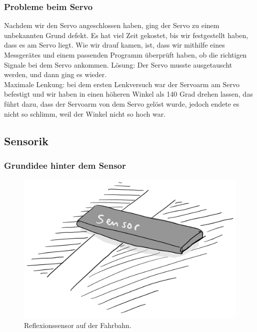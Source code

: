     \subsubsection{Probleme beim Servo}
        
            Nachdem wir den Servo angeschlossen haben, ging der Servo zu einem unbekannten Grund defekt. Es hat viel Zeit gekostet, bis wir festgestellt haben, dass es am Servo liegt.
            Wie wir drauf kamen, ist, dass wir mithilfe eines Messgerätes und einem passenden Programm überprüft haben, ob die richtigen Signale bei dem Servo ankommen.
            Lösung: Der Servo musste ausgetauscht werden, und dann ging es wieder.\\
            
            Maximale Lenkung: bei dem ersten Lenkversuch war der Servoarm am Servo befestigt und wir haben in einen höheren Winkel als 140 Grad drehen lassen, das führt dazu, dass der Servoarm von dem Servo gelöst wurde, jedoch endete es nicht so schlimm, weil der Winkel nicht so hoch war.

	\subsection{Sensorik}
	
	\subsubsection{Grundidee hinter dem Sensor}
	
	\begin{figure}[H]
		\centering
		\label{SensorTitel}
		\includegraphics[scale=0.5]{img/Sensor/Sensor1.png}
		\caption{Reflexionssensor auf der Fahrbahn.}
	\end{figure}
	
